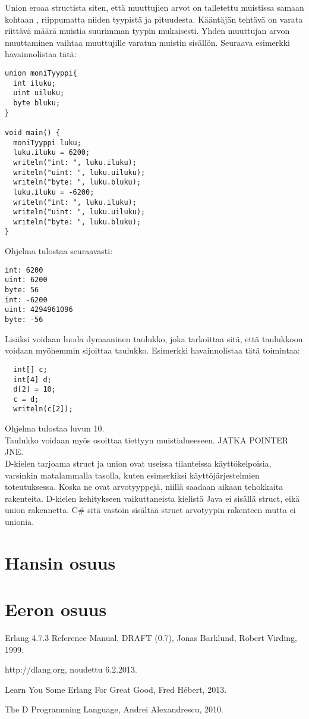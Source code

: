 \documentclass[11pt,oneside,a4paper]{article}
\begin{document}
Union eroaa structista siten, että muuttujien arvot on talletettu muistissa samaan kohtaan \cite{ALE10}, riippumatta niiden tyypistä ja pituudesta. Kääntäjän tehtävä on varata riittävä määrä muistia suurimman tyypin mukaisesti. Yhden muuttujan arvon muuttaminen vaihtaa muuttujille varatun muistin sisällön. Seuraava esimerkki havainnolistaa tätä:
\begin{verbatim}
union moniTyyppi{
  int iluku;
  uint uiluku;
  byte bluku;
}

void main() {
  moniTyyppi luku;
  luku.iluku = 6200;
  writeln("int: ", luku.iluku);
  writeln("uint: ", luku.uiluku);
  writeln("byte: ", luku.bluku);
  luku.iluku = -6200;
  writeln("int: ", luku.iluku);
  writeln("uint: ", luku.uiluku);
  writeln("byte: ", luku.bluku);
}
\end{verbatim}
Ohjelma tulostaa seuraavasti:

\begin{verbatim}
int: 6200
uint: 6200
byte: 56
int: -6200
uint: 4294961096
byte: -56
\end{verbatim}

Lisäksi voidaan luoda dymaaninen taulukko, joka tarkoittaa sitä, että taulukkoon voidaan myöhemmin sijoittaa taulukko. Esimerkki havainnolistaa tätä toimintaa:

\begin{verbatim}
  int[] c;
  int[4] d;
  d[2] = 10;
  c = d;
  writeln(c[2]);
\end{verbatim}
Ohjelma tulostaa luvun 10. \\
Taulukko voidaan myös osoittaa tiettyyn muistialueeseen. JATKA POINTER JNE. \\


D-kielen tarjoama struct ja union ovat useissa tilanteissa käyttökelpoisia, varsinkin matalammalla tasolla, kuten esimerkiksi käyttöjärjestelmien toteutuksessa. Koska ne ovat arvotyyppejä, niillä saadaan aikaan tehokkaita rakenteita. D-kielen kehitykseen vaikuttaneista kielistä Java ei sisällä struct, eikä union rakennetta. C\# sitä vastoin sisältää struct arvotyypin rakenteen mutta ei unionia.


\section{Hansin osuus}

\section{Eeron osuus}






\begin{thebibliography}{99}

 Erlang 4.7.3 Reference Manual, DRAFT (0.7), Jonas
Barklund, Robert Virding, 1999. 

 http://dlang.org, noudettu 6.2.2013.

 Learn You Some Erlang For Great Good, Fred Hébert, 2013.

 The D Programming Language, Andrei Alexandrescu, 2010.

\end{thebibliography}
\end{document}
